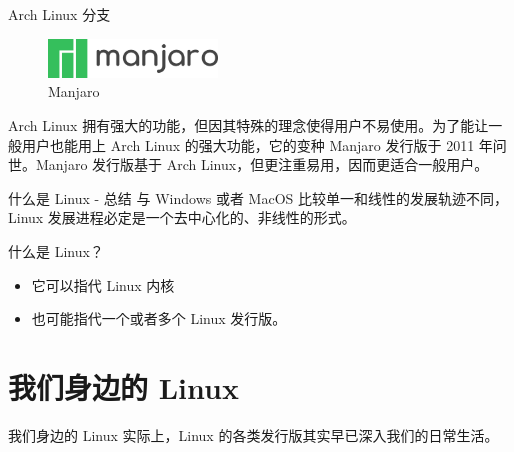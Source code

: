 \documentclass[UTF8]{ctexbeamer}
\begin{document}
\begin{frame}{Arch Linux 分支}
    \begin{figure}
        \centering
        \includegraphics[width=0.4\textwidth]{manjaro.png}
        \caption{Manjaro}
        \label{fig:manjaro}
    \end{figure}
    Arch Linux 拥有强大的功能，但因其特殊的理念使得用户不易使用。为了能让一般用户也能用上 Arch Linux 的强大功能，它的变种 Manjaro 发行版于 2011 年问世。Manjaro 发行版基于 Arch Linux，但更注重易用，因而更适合一般用户。
\end{frame}
\begin{frame}{什么是 Linux - 总结}
    与 Windows 或者 MacOS 比较单一和线性的发展轨迹不同，Linux 发展进程必定是一个去中心化的、非线性的形式。

    什么是 Linux？
    \begin{itemize}
        \item 它可以指代 Linux 内核
        \item 也可能指代一个或者多个 Linux 发行版。
    \end{itemize}
\end{frame}
\section{我们身边的 Linux}
\begin{frame}{我们身边的 Linux}
    实际上，Linux 的各类发行版其实早已深入我们的日常生活。
\end{frame}
\end{document}
